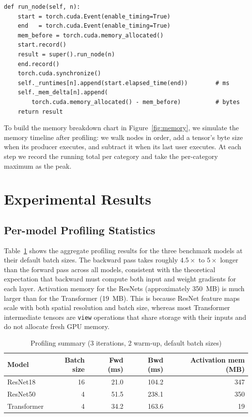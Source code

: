 \documentclass[11pt]{article}
\begin{document}
\begin{lstlisting}[caption={Per-node timing in \texttt{run\_node}},
                   label={lst:runnode}]
def run_node(self, n):
    start = torch.cuda.Event(enable_timing=True)
    end   = torch.cuda.Event(enable_timing=True)
    mem_before = torch.cuda.memory_allocated()
    start.record()
    result = super().run_node(n)
    end.record()
    torch.cuda.synchronize()
    self._runtimes[n].append(start.elapsed_time(end))        # ms
    self._mem_delta[n].append(
        torch.cuda.memory_allocated() - mem_before)          # bytes
    return result
\end{lstlisting}

To build the memory breakdown chart in Figure~\ref{fig:memory}, we
simulate the memory timeline after profiling: we walk nodes in order,
add a tensor's byte size when its producer executes, and subtract it
when its last user executes.
At each step we record the running total per category and take the
per-category maximum as the peak.

\section{Experimental Results}

\subsection{Per-model Profiling Statistics}

Table~\ref{tab:profresults} shows the aggregate profiling results for
the three benchmark models at their default batch sizes.
The backward pass takes roughly $4.5\times$ to $5\times$ longer than
the forward pass across all models, consistent with the theoretical
expectation that backward must compute both input and weight gradients
for each layer.
Activation memory for the ResNets (approximately 350~MB) is much larger
than for the Transformer (19~MB).
This is because ResNet feature maps scale with both spatial resolution
and batch size, whereas most Transformer intermediate tensors are
\texttt{view} operations that share storage with their inputs and do
not allocate fresh GPU memory.

\begin{table}[h]
\centering
\caption{Profiling summary (3 iterations, 2 warm-up, default batch sizes)}
\label{tab:profresults}
\begin{tabular}{lrrrr}
\toprule
\textbf{Model} & \textbf{Batch size} & \textbf{Fwd (ms)} &
\textbf{Bwd (ms)} & \textbf{Activation mem (MB)} \\
\midrule
ResNet18     & 16 & 21.0  & 104.2 & 347 \\
ResNet50     & 4  & 51.5  & 238.1 & 350 \\
Transformer  & 4  & 34.2  & 163.6 &  19 \\
\bottomrule
\end{tabular}
\end{table}
\end{document}
